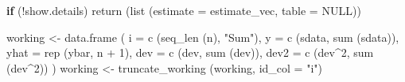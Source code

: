 \documentclass[
  letterpaper,
  DIV=11,
  numbers=noendperiod]{scrreprt}
\newenvironment{Shaded}{\begin{snugshade}}{\end{snugshade}}
\newcommand{\AttributeTok}[1]{\textcolor[rgb]{0.40,0.45,0.13}{#1}}
\newcommand{\ConstantTok}[1]{\textcolor[rgb]{0.56,0.35,0.01}{#1}}
\newcommand{\ControlFlowTok}[1]{\textcolor[rgb]{0.00,0.23,0.31}{\textbf{#1}}}
\newcommand{\DecValTok}[1]{\textcolor[rgb]{0.68,0.00,0.00}{#1}}
\newcommand{\FunctionTok}[1]{\textcolor[rgb]{0.28,0.35,0.67}{#1}}
\newcommand{\NormalTok}[1]{\textcolor[rgb]{0.00,0.23,0.31}{#1}}
\newcommand{\OtherTok}[1]{\textcolor[rgb]{0.00,0.23,0.31}{#1}}
\newcommand{\SpecialCharTok}[1]{\textcolor[rgb]{0.37,0.37,0.37}{#1}}
\newcommand{\StringTok}[1]{\textcolor[rgb]{0.13,0.47,0.30}{#1}}
\renewcommand{\[}{\begin{equation}}
\renewcommand{\]}{\end{equation}}
\begin{document}
\begin{Shaded}
\begin{Highlighting}[]
    \ControlFlowTok{if}\NormalTok{ (}\SpecialCharTok{!}\NormalTok{show.details)}
        \FunctionTok{return}\NormalTok{ (}\FunctionTok{list}\NormalTok{ (}\AttributeTok{estimate =}\NormalTok{ estimate\_vec, }\AttributeTok{table =} \ConstantTok{NULL}\NormalTok{))}

\NormalTok{    working }\OtherTok{\textless{}{-}} \FunctionTok{data.frame}\NormalTok{ (}
        \AttributeTok{i    =} \FunctionTok{c}\NormalTok{ (}\FunctionTok{seq\_len}\NormalTok{ (n), }\StringTok{"Sum"}\NormalTok{),}
        \AttributeTok{y    =} \FunctionTok{c}\NormalTok{ (sdata, }\FunctionTok{sum}\NormalTok{ (sdata)),}
        \AttributeTok{yhat =} \FunctionTok{rep}\NormalTok{ (ybar, n }\SpecialCharTok{+} \DecValTok{1}\NormalTok{),}
        \AttributeTok{dev  =} \FunctionTok{c}\NormalTok{ (dev, }\FunctionTok{sum}\NormalTok{ (dev)),}
        \AttributeTok{dev2 =} \FunctionTok{c}\NormalTok{ (dev}\SpecialCharTok{\^{}}\DecValTok{2}\NormalTok{, }\FunctionTok{sum}\NormalTok{ (dev}\SpecialCharTok{\^{}}\DecValTok{2}\NormalTok{))}
\NormalTok{    )}
\NormalTok{    working }\OtherTok{\textless{}{-}} \FunctionTok{truncate\_working}\NormalTok{ (working, }\AttributeTok{id\_col =} \StringTok{"i"}\NormalTok{)}


\end{Highlighting}
\end{Shaded}
\end{document}

